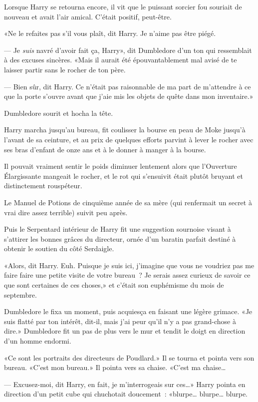 Lorsque Harry se retourna encore, il vit que le puissant sorcier fou souriait de nouveau et avait l'air amical. C'était positif, peut-être.

«Ne le refaites pas s'il vous plaît, dit Harry. Je n'aime pas être piégé.

--- Je \emph{suis} navré d'avoir fait ça, Harry», dit Dumbledore d'un ton qui ressemblait à des excuses sincères. «Mais il aurait été épouvantablement mal avisé de te laisser partir sans le rocher de ton père.

--- Bien sûr, dit Harry. Ce n'était pas raisonnable de ma part de m'attendre à ce que la porte s'ouvre avant que j'aie mis les objets de quête dans mon inventaire.»

Dumbledore sourit et hocha la tête.

Harry marcha jusqu'au bureau, fit coulisser la bourse en peau de Moke jusqu'à l'avant de sa ceinture, et au prix de quelques efforts parvint à lever le rocher avec ses bras d'enfant de onze ans et à le donner à manger à la bourse.

Il pouvait vraiment sentir le poids diminuer lentement alors que l'Ouverture Élargissante mangeait le rocher, et le rot qui s'ensuivit était plutôt bruyant et distinctement rouspéteur.

Le Manuel de Potions de cinquième année de sa mère (qui renfermait un secret à vrai dire assez terrible) suivit peu après.

Puis le Serpentard intérieur de Harry fit une suggestion sournoise visant à s'attirer les bonnes grâces du directeur, ornée d'un baratin parfait destiné à obtenir le soutien du côté Serdaigle.

«Alors, dit Harry. Euh. Puisque je suis ici, j'imagine que vous ne voudriez pas me faire faire une petite visite de votre bureau~? Je serais assez curieux de savoir ce que sont certaines de ces choses,» et c'était son euphémisme du mois de septembre.

Dumbledore le fixa un moment, puis acquiesça en faisant une légère grimace. «Je suis flatté par ton intérêt, dit-il, mais j'ai peur qu'il n'y a pas grand-chose à dire.» Dumbledore fit un pas de plus vers le mur et tendit le doigt en direction d'un homme endormi.

«Ce sont les portraits des directeurs de Poudlard.» Il se tourna et pointa vers son bureau. «C'est mon bureau.» Il pointa vers sa chaise. «C'est ma chaise…

--- Excusez-moi, dit Harry, en fait, je m'interrogeais sur ces…» Harry pointa en direction d'un petit cube qui chuchotait doucement~: «blurpe… blurpe… blurpe.

